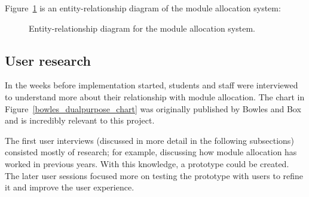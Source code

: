 \documentclass[]{scrartcl}
\begin{document}


Figure~\ref{er_diagram} is an entity-relationship diagram of the module
allocation system:

\begin{figure}
  \caption{Entity-relationship diagram for the module allocation system.}
  \label{er_diagram}
\end{figure}

\subsection{User research}

In the weeks before implementation started, students and staff were
interviewed to understand more about their relationship with module
allocation. The chart in Figure~\ref{bowles_dualpurpose_chart} was originally
published by Bowles and Box and is incredibly relevant to this project.

The first user interviews (discussed in more detail in the following
subsections) consisted mostly of research; for example, discussing how module
allocation has worked in previous years. With this knowledge, a prototype
could be created. The later user sessions focused more on testing the
prototype with users to refine it and improve the user experience.
\end{document}
